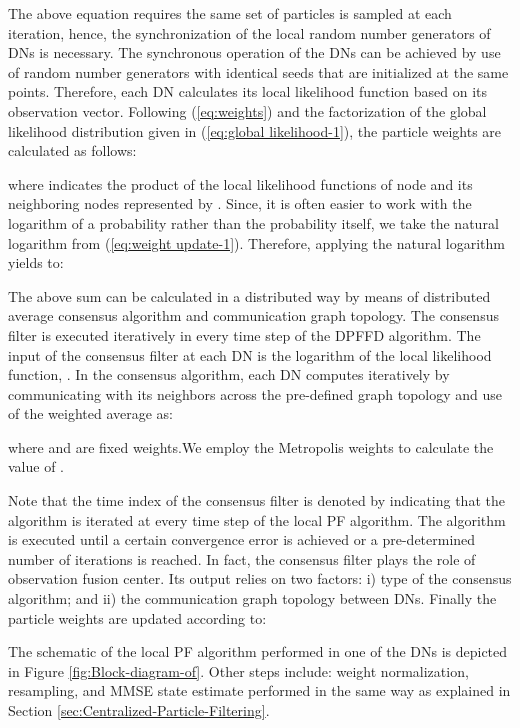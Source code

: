 \documentclass[10pt,twocolumn,twoside]{IEEEtran}
\begin{document}
The above equation requires the same set of particles 
is sampled at each iteration, hence, the synchronization of the local
random number generators of DNs is necessary. The synchronous operation
of the DNs can be achieved by use of random number generators with
identical seeds that are initialized at the same points. Therefore,
each DN calculates its local likelihood function based on its observation
vector. Following (\ref{eq:weights}) and the factorization of the
global likelihood distribution given in (\ref{eq:global likelihood-1}),
the particle weights are calculated as follows:

where {\small{}}
indicates the product of the local likelihood functions of node 
and its neighboring nodes represented by . Since,
it is often easier to work with the logarithm of a probability rather
than the probability itself, we take the natural logarithm from (\ref{eq:weight update-1}).
Therefore, applying the natural logarithm \cite{hlinka2013distributed}
yields to:

The above sum can be calculated in a distributed way by means of distributed
average consensus algorithm \cite{xiao2004fast,xiao2005scheme} and
communication graph topology. The consensus filter is executed iteratively
in every time step of the DPFFD algorithm. The input of the consensus
filter at each DN is the logarithm of the local likelihood function,
. In the consensus
algorithm, each DN computes 
iteratively by communicating with its neighbors across the pre-defined
graph topology and use of the weighted average as:

\noindent where  and  are fixed
weights.We employ the Metropolis weights to calculate the value of
 \cite{xiao2005scheme,xiao2004fast}. 

Note that the time index of the consensus filter is denoted
by  indicating that the algorithm is iterated at every time step
 of the local PF algorithm. The algorithm is executed until a
certain convergence error is achieved or a pre-determined number of
iterations is reached. In fact, the consensus filter plays the role
of observation fusion center. Its output relies on two factors: i)
type of the consensus algorithm; and ii) the communication graph topology
between DNs. Finally the particle weights are updated according to:

The schematic of the local PF algorithm performed in one of the DNs
is depicted in Figure \ref{fig:Block-diagram-of}. Other steps include:
weight normalization, resampling, and MMSE state estimate performed
in the same way as explained in Section \ref{sec:Centralized-Particle-Filtering}.
\end{document}
